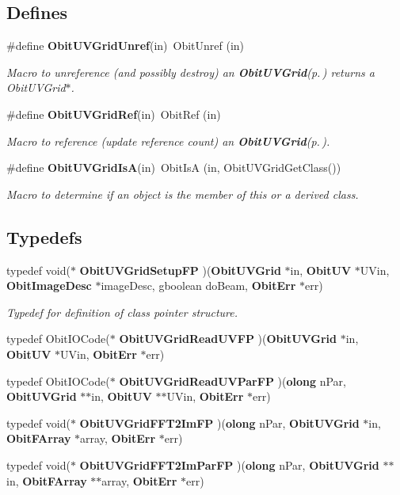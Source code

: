 \subsection*{Defines}
\begin{CompactItemize}
\item 
\#define {\bf Obit\-UVGrid\-Unref}(in)\ Obit\-Unref (in)
\begin{CompactList}\small\item\em Macro to unreference (and possibly destroy) an {\bf Obit\-UVGrid}{\rm (p.\,\pageref{structObitUVGrid})} returns a Obit\-UVGrid$\ast$. \item\end{CompactList}\item 
\#define {\bf Obit\-UVGrid\-Ref}(in)\ Obit\-Ref (in)
\begin{CompactList}\small\item\em Macro to reference (update reference count) an {\bf Obit\-UVGrid}{\rm (p.\,\pageref{structObitUVGrid})}. \item\end{CompactList}\item 
\#define {\bf Obit\-UVGrid\-Is\-A}(in)\ Obit\-Is\-A (in, Obit\-UVGrid\-Get\-Class())
\begin{CompactList}\small\item\em Macro to determine if an object is the member of this or a derived class. \item\end{CompactList}\end{CompactItemize}
\subsection*{Typedefs}
\begin{CompactItemize}
\item 
typedef void($\ast$ {\bf Obit\-UVGrid\-Setup\-FP} )({\bf Obit\-UVGrid} $\ast$in, {\bf Obit\-UV} $\ast$UVin, {\bf Obit\-Image\-Desc} $\ast$image\-Desc, gboolean do\-Beam, {\bf Obit\-Err} $\ast$err)
\begin{CompactList}\small\item\em Typedef for definition of class pointer structure. \item\end{CompactList}\item 
typedef Obit\-IOCode($\ast$ {\bf Obit\-UVGrid\-Read\-UVFP} )({\bf Obit\-UVGrid} $\ast$in, {\bf Obit\-UV} $\ast$UVin, {\bf Obit\-Err} $\ast$err)
\item 
typedef Obit\-IOCode($\ast$ {\bf Obit\-UVGrid\-Read\-UVPar\-FP} )({\bf olong} n\-Par, {\bf Obit\-UVGrid} $\ast$$\ast$in, {\bf Obit\-UV} $\ast$$\ast$UVin, {\bf Obit\-Err} $\ast$err)
\item 
typedef void($\ast$ {\bf Obit\-UVGrid\-FFT2Im\-FP} )({\bf olong} n\-Par, {\bf Obit\-UVGrid} $\ast$in, {\bf Obit\-FArray} $\ast$array, {\bf Obit\-Err} $\ast$err)
\item 
typedef void($\ast$ {\bf Obit\-UVGrid\-FFT2Im\-Par\-FP} )({\bf olong} n\-Par, {\bf Obit\-UVGrid} $\ast$$\ast$in, {\bf Obit\-FArray} $\ast$$\ast$array, {\bf Obit\-Err} $\ast$err)
\end{CompactItemize}
